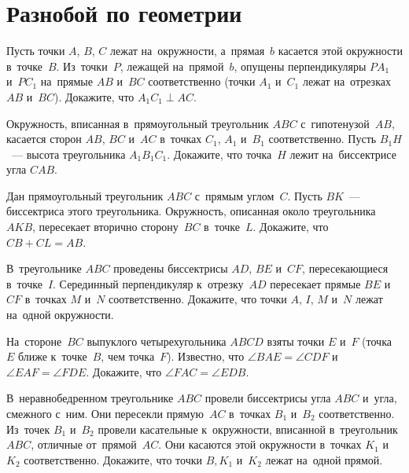 
\section*{Разнобой по геометрии}


\begin{problems}

\item
Пусть точки $A$, $B$, $C$ лежат на~окружности, а~прямая~$b$ касается этой
окружности в~точке~$B$.
Из~точки~$P$, лежащей на~прямой~$b$, опущены перпендикуляры $P A_1$ и~$P C_1$
на~прямые $AB$ и~$BC$ соответственно (точки $A_1$ и~$C_1$ лежат
на~отрезках $AB$ и~$BC$).
Докажите, что $A_1 C_1 \perp AC$.

\item
Окружность, вписанная в~прямоугольный треугольник $ABC$ с~гипотенузой~$AB$,
касается сторон $AB$, $BC$ и~$AC$ в~точках $C_1$, $A_1$ и~$B_1$ соответственно.
Пусть $B_1 H$~--- высота треугольника $A_1 B_1 C_1$.
Докажите, что точка~$H$ лежит на~биссектрисе угла $CAB$.

\item
Дан прямоугольный треугольник $ABC$ с~прямым углом~$C$.
Пусть $BK$~--- биссектриса этого треугольника.
Окружность, описанная около треугольника $AKB$, пересекает вторично
сторону~$BC$ в~точке~$L$.
Докажите, что $CB + CL = AB$.

\item
В~треугольнике $ABC$ проведены биссектрисы $AD$, $BE$ и~$CF$, пересекающиеся
в~точке~$I$.
Серединный перпендикуляр к~отрезку~$AD$ пересекает прямые $BE$ и~$CF$
в~точках $M$ и~$N$ соответственно.
Докажите, что точки $A$, $I$, $M$ и~$N$ лежат на~одной окружности.


\item
На~стороне~$BC$ выпуклого четырехугольника $ABCD$ взяты точки $E$ и~$F$
(точка~$E$ ближе к~точке~$B$, чем точка~$F$).
Известно, что $\angle BAE = \angle CDF$ и~$\angle EAF = \angle FDE$.
Докажите, что $\angle FAC = \angle EDB$.

\item
В~неравнобедренном треугольнике $ABC$ провели биссектрисы угла $ABC$ и~угла,
смежного с~ним.
Они пересекли прямую~$AC$ в~точках $B_1$ и~$B_2$ соответственно.
Из~точек $B_1$ и~$B_2$ провели касательные к~окружности,
вписанной в~треугольник $ABC$, отличные от~прямой~$AC$.
Они касаются этой окружности в~точках $K_1$ и~$K_2$ соответственно.
Докажите, что точки $B, K_1$ и~$K_2$ лежат на~одной прямой.

\end{problems}

